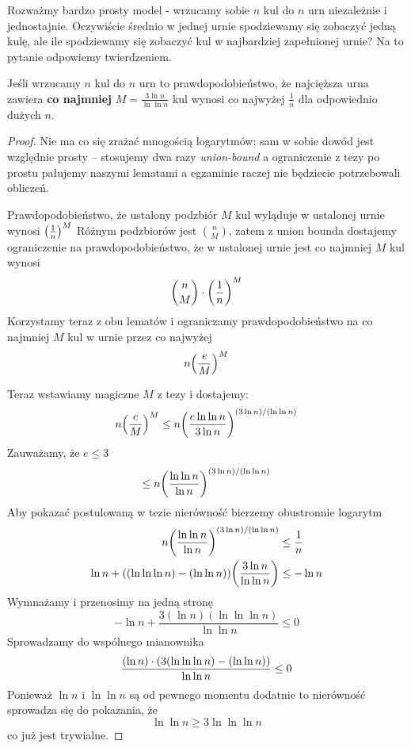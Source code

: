 Rozważmy bardzo prosty model - wrzucamy sobie \( n \) kul do \( n \) urn niezależnie i jednostajnie.
Oczywiście średnio w jednej urnie spodziewamy się zobaczyć jedną kulę, ale ile spodziewamy się zobaczyć kul w najbardziej zapełnionej urnie?
Na to pytanie odpowiemy twierdzeniem.
\begin{theorem}[Lemat 5.1 P\&C]
    \label{balls-and-bins-max-load-upper-bound}
    Jeśli wrzucamy \( n \) kul do \( n \) urn to prawdopodobieństwo, że najcięższa urna zawiera
    \textbf{co najmniej} \( M = \frac{3 \ln n}{\ln \ln n} \) kul wynosi co najwyżej \( \frac{1}{n} \) dla odpowiednio dużych \( n \).
\end{theorem}
\begin{proof}
    Nie ma co się zrażać mnogością logarytmów; sam w sobie dowód jest względnie prosty -- stosujemy dwa razy \textit{union-bound} a ograniczenie z tezy po prostu pałujemy naszymi lematami a egzaminie raczej nie będziecie potrzebowali obliczeń.
    
    
    Prawdopodobieństwo, że ustalony podzbiór \( M \) kul wyląduje w ustalonej urnie wynosi
    \( \left(\frac{1}{n}\right)^M \)
    Różnym podzbiorów jest \( \binom{n}{M} \), zatem z union bounda dostajemy ograniczenie na prawdopodobieństwo, że w ustalonej urnie jest co najmniej \( M \) kul wynosi
    \[
        \binom{n}{M} \cdot \left(\frac{1}{n}\right)^M
    \]
    Korzystamy teraz z obu lematów i ograniczamy prawdopodobieństwo na co najmniej \( M \) kul w urnie przez co najwyżej
    \[
        n\pars{\frac{e}{M}}^M
    \]
    
    Teraz wstawiamy magiczne \( M \) z tezy i dostajemy:
    \[
        n\pars{\frac{e}{M}}^M \leq n\pars{\frac{e \ln \ln n}{3 \ln n}}^{(3 \ln n)/(\ln \ln n)}
    \]
    Zauważamy, że \( e \leq 3 \)
    \[
        \leq n\pars{\frac{\ln \ln n}{\ln n}}^{(3 \ln n)/(\ln \ln n)}
    \]
    Aby pokazać postulowaną w tezie nierówność bierzemy obustronnie logarytm
    \begin{align*}
        n\pars{\frac{\ln \ln n}{\ln n}}^{(3 \ln n)/(\ln \ln n)} &\leq \frac{1}{n} \\
        \ln n + \pars{(\ln \ln \ln n) - (\ln \ln n)}\pars{\frac{3 \ln n}{\ln \ln n}} &\leq -\ln n
    \end{align*}
    Wymnażamy i przenosimy na jedną stronę
    \[
        -\ln n + \frac{3 (\ln n)(\ln \ln \ln n)}{\ln \ln n} \leq 0
    \]
    Sprowadzamy do wspólnego mianownika
    \[
        \frac{(\ln n) \cdot \left(3(\ln \ln \ln n) - (\ln \ln n)\right)}{\ln \ln n} \leq 0
    \]
    Ponieważ \( \ln n \) i \(\ln \ln n\) są od pewnego momentu dodatnie
    to nierówność sprowadza się do pokazania, że 
    \[
    \ln \ln n \geq 3 \ln \ln \ln n
    \]
    co już jest trywialne.
    
\end{proof}